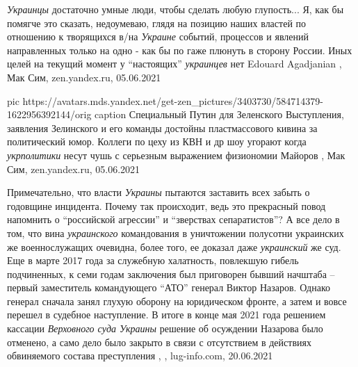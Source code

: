 \emph{Украинцы} достаточно умные люди, чтобы сделать любую глупость...  Я, как
бы помягче это сказать, недоумеваю, глядя на позицию наших властей по отношению
к творящихся в/на \emph{Украине} событий, процессов и явлений направленных
только на одно - как бы по гаже плюнуть в сторону России. Иных целей на текущий
момент у \enquote{настоящих} \emph{украинцев} нет
Edouard Agadjanian
, 
Мак Сим, zen.yandex.ru, 05.06.2021

\ifcmt
  pic https://avatars.mds.yandex.net/get-zen_pictures/3403730/584714379-1622956392144/orig
	caption Специальный Путин для Зеленского
\fi
Выступления, заявления Зелинского и его команды достойны пластмассового кивина
за политический юмор. Коллеги по цеху из КВН и др шоу угорают когда \emph{укрполитики}
несут чушь с серьезным выражением физиономии
Майоров
, 
Мак Сим, zen.yandex.ru, 05.06.2021

Примечательно, что власти \emph{Украины} пытаются заставить всех забыть о годовщине
инцидента. Почему так происходит, ведь это прекрасный повод напомнить о
\enquote{российской агрессии} и \enquote{зверствах сепаратистов}? А все дело в том, что вина
\emph{украинского} командования в уничтожении полусотни украинских же военнослужащих
очевидна, более того, ее доказал даже \emph{украинский} же суд. Еще в марте 2017 года
за служебную халатность, повлекшую гибель подчиненных, к семи годам заключения
был приговорен бывший начштаба – первый заместитель командующего \enquote{АТО} генерал
Виктор Назаров. Однако генерал сначала занял глухую оборону на юридическом
фронте, а затем и вовсе перешел в судебное наступление. В итоге в конце мая
2021 года решением кассации \emph{Верховного суда Украины} решение об осуждении
Назарова было отменено, а само дело было закрыто в связи с отсутствием в
действиях обвиняемого состава преступления
, 
, lug-info.com, 20.06.2021



